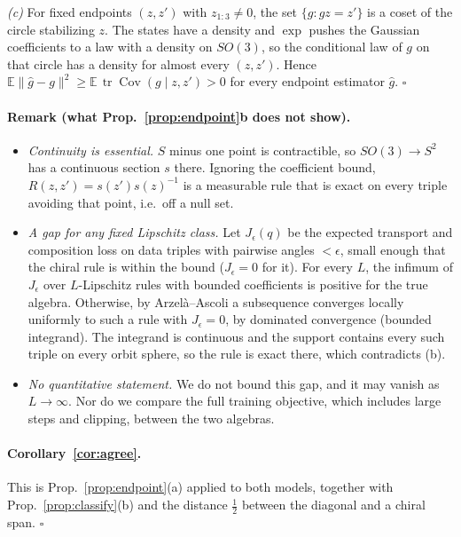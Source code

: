 \emph{(c)} For fixed endpoints $(z,z')$ with $z_{1:3}\neq0$, the set $\{g:gz=z'\}$ is a coset of the circle
stabilizing $z$. The states have a density and $\exp$ pushes the Gaussian coefficients to a law with a density on
$SO(3)$, so the conditional law of $g$ on that circle has a density for almost every $(z,z')$. Hence
$\mathbb E\|\hat g-g\|^2\ge\mathbb E\,\operatorname{tr}\operatorname{Cov}(g\mid z,z')>0$ for every endpoint
estimator $\hat g$. $\square$

\paragraph{Remark (what Prop.~\ref{prop:endpoint}b does not show).}
\begin{itemize}
\item \emph{Continuity is essential.} $S$ minus one point is contractible, so $SO(3)\to S^2$ has a continuous
section $s$ there. Ignoring the coefficient bound, $R(z,z')=s(z')s(z)^{-1}$ is a measurable rule that is exact on
every triple avoiding that point, i.e.\ off a null set.
\item \emph{A gap for any fixed Lipschitz class.} Let $J_\epsilon(q)$ be the expected transport and composition loss
on data triples with pairwise angles $<\epsilon$, small enough that the chiral rule is within the bound
($J_\epsilon=0$ for it). For every $L$, the infimum of $J_\epsilon$ over $L$-Lipschitz rules with bounded
coefficients is positive for the true algebra. Otherwise, by Arzel\`a--Ascoli a subsequence converges locally
uniformly to such a rule with $J_\epsilon=0$, by dominated convergence (bounded integrand). The integrand is
continuous and the support contains every such triple on every orbit sphere, so the rule is exact there, which
contradicts (b).
\item \emph{No quantitative statement.} We do not bound this gap, and it may vanish as $L\to\infty$. Nor do we
compare the full training objective, which includes large steps and clipping, between the two algebras.
\end{itemize}

\paragraph{Corollary~\ref{cor:agree}.}
This is Prop.~\ref{prop:endpoint}(a) applied to both models, together with Prop.~\ref{prop:classify}(b) and the
distance $\frac12$ between the diagonal and a chiral span. $\square$
